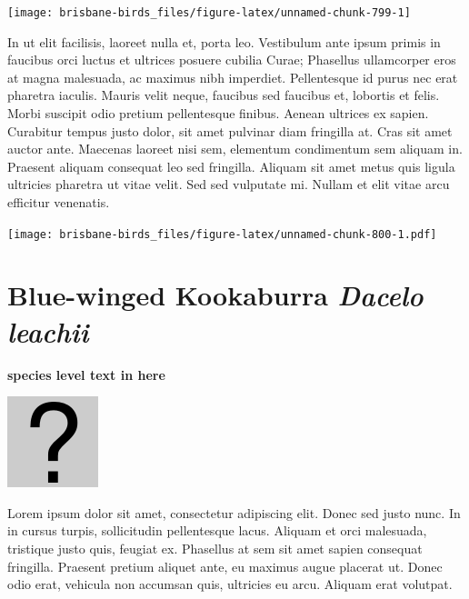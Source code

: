 \documentclass[]{book}
\let\origfigure\figure
\let\endorigfigure\endfigure
\renewenvironment{figure}[1][2] {
  \expandafter\origfigure\expandafter[H]
} {
  \endorigfigure
}
\begin{document}
\begin{figure}
\texttt{[image: brisbane-birds\_files/figure-latex/unnamed-chunk-799-1]} \caption{insert figure caption}\label{fig:unnamed-chunk-799}
\end{figure}

In ut elit facilisis, laoreet nulla et, porta leo. Vestibulum ante ipsum
primis in faucibus orci luctus et ultrices posuere cubilia Curae;
Phasellus ullamcorper eros at magna malesuada, ac maximus nibh
imperdiet. Pellentesque id purus nec erat pharetra iaculis. Mauris velit
neque, faucibus sed faucibus et, lobortis et felis. Morbi suscipit odio
pretium pellentesque finibus. Aenean ultrices ex sapien. Curabitur
tempus justo dolor, sit amet pulvinar diam fringilla at. Cras sit amet
auctor ante. Maecenas laoreet nisi sem, elementum condimentum sem
aliquam in. Praesent aliquam consequat leo sed fringilla. Aliquam sit
amet metus quis ligula ultricies pharetra ut vitae velit. Sed sed
vulputate mi. Nullam et elit vitae arcu efficitur venenatis.

\begin{figure}
\centering
\texttt{[image: brisbane-birds\_files/figure-latex/unnamed-chunk-800-1.pdf]}
\caption{\label{fig:unnamed-chunk-800}insert figure caption}
\end{figure}

\section{\texorpdfstring{Blue-winged Kookaburra \emph{Dacelo
leachii}}{Blue-winged Kookaburra Dacelo leachii}}\label{blue-winged-kookaburra-dacelo-leachii}

\textbf{species level text in here}

\begin{figure}
\centering
\includegraphics{assets/missing.png}
\caption{No image for species}
\end{figure}

Lorem ipsum dolor sit amet, consectetur adipiscing elit. Donec sed justo
nunc. In in cursus turpis, sollicitudin pellentesque lacus. Aliquam et
orci malesuada, tristique justo quis, feugiat ex. Phasellus at sem sit
amet sapien consequat fringilla. Praesent pretium aliquet ante, eu
maximus augue placerat ut. Donec odio erat, vehicula non accumsan quis,
ultricies eu arcu. Aliquam erat volutpat.
\end{document}

